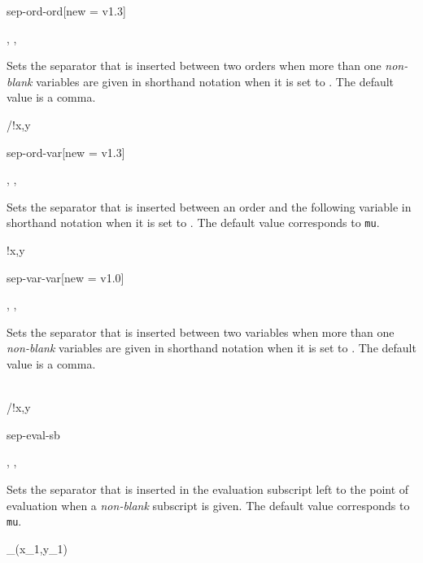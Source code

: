 \begin{option}{sep-ord-ord}[new = v1.3]
	\begin{values}[default = {{,}}]
		, , 
	\end{values}
	Sets the separator that is inserted between two orders when more than one \emph{non-blank} variables are given in shorthand notation when it is set to . The default value is a comma.
	\begin{example}
		/!{x,y}
	\end{example}
\end{option}

\begin{option}{sep-ord-var}[new = v1.3]
	\begin{values}[default = 0]
		, , \marg{delimiter}
	\end{values}
	Sets the separator that is inserted between an order and the following variable in shorthand notation when it is set to . The default value corresponds to  \texttt{mu}.
	\begin{example}
		!{x,y}
	\end{example}
\end{option}

\begin{option}{sep-var-var}[new = v1.0]
	\begin{values}[default = {{,}}]
		, , 
	\end{values}
	Sets the separator that is inserted between two variables when more than one \emph{non-blank} variables are given in shorthand notation when it is set to . The default value is a comma.
	\begin{example}
		\odv[sep-var-var=\here]{f}{x,y} \\
		/!{x,y}
	\end{example}
\end{option}

\begin{option}{sep-eval-sb}
	\begin{values}[default = 0]
		, , 
	\end{values}
	Sets the separator that is inserted in the evaluation subscript left to the point of evaluation when a \emph{non-blank} subscript is given. The default value corresponds to  \texttt{mu}.
	\begin{example}
		_{(x_1,y_1)}
	\end{example}
\end{option}

